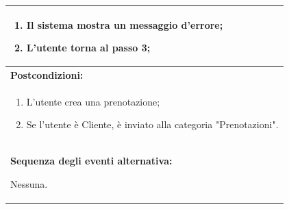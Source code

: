\documentclass{article}
\begin{document}
\begin{table}[t]
\begin{tabular}{|p{\linewidth}|}
\begin{enumerate}
\begin{enumerate}
                                \item Il sistema mostra un messaggio d'errore;
                                \item L'utente torna al passo 3;
                            \end{enumerate}
                        \end{enumerate} \\
                        \hline
                        \cellcolor{gray!20}
                        \textbf{Postcondizioni:} \\
                        \cellcolor{gray!20}
                        \begin{minipage}{\linewidth}
                            \begin{enumerate}[noitemsep]
                                \item L'utente crea una prenotazione; %
                                \item Se l'utente è Cliente, è inviato alla categoria "Prenotazioni".
                            \end{enumerate}
                        \end{minipage}
                        \vspace{-5pt} \\
                        \hline
                        \textbf{Sequenza degli eventi alternativa:}
                        
                        Nessuna. \\
                        \hline
                    \end{tabular}
                \end{table}
\end{document}

